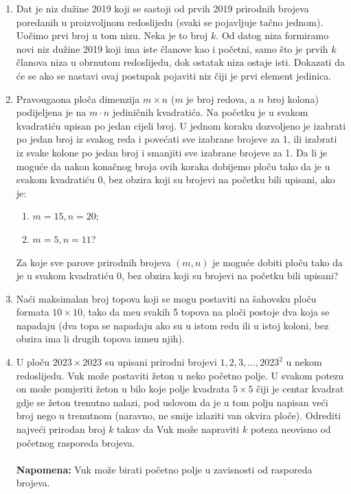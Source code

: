\documentclass{article}
\begin{document}
\begin{enumerate}
    \item Dat je niz du\v{z}ine 2019 koji se sastoji od prvih 2019 prirodnih brojeva poredanih u proizvoljnom redoslijedu (svaki se pojavljuje ta\v{c}no jednom). Uo\v{c}imo prvi broj u tom nizu. Neka je to broj $k$. Od datog niza formiramo novi niz du\v{z}ine 2019 koji ima iste \v{c}lanove kao i po\v{c}etni, samo \v{s}to je prvih $k$ \v{c}lanova niza u obrnutom redoslijedu, dok ostatak niza ostaje isti. Dokazati da \'ce se ako se nastavi ovaj postupak pojaviti niz \v{c}iji je prvi element jedinica.

    \item Pravougaona plo\v{c}a dimenzija $m \times n$ ($m$ je broj redova, a $n$ broj kolona) podijeljena je na $m \cdot n$ jedini\v{c}nih kvadrati\'ca. Na po\v{c}etku je u svakom kvadrati\'cu upisan po jedan cijeli broj. U jednom koraku dozvoljeno je izabrati po jedan broj iz svakog reda i pove\'cati sve izabrane brojeve za 1, ili izabrati iz svake kolone po jedan broj i smanjiti sve izabrane brojeve za 1. Da li je mogu\'ce da nakon kona\v{c}nog broja ovih koraka dobijemo plo\v{c}u tako da je u svakom kvadrati\'cu 0, bez obzira koji su brojevi na po\v{c}etku bili upisani, ako je:
    \begin{enumerate}
        \item[a)] $m = 15, n = 20$;
        \item[b)] $m = 5, n = 11$?
    \end{enumerate}
    Za koje sve parove prirodnih brojeva $(m, n)$ je mogu\'ce dobiti plo\v{c}u tako da je u svakom kvadrati\'cu 0, bez obzira koji su brojevi na po\v{c}etku bili upisani?

    \item Na\'ci maksimalan broj topova koji se mogu postaviti na \v{s}ahovsku plo\v{c}u formata $10 \times 10$, tako da me\dj u svakih 5 topova na plo\v{c}i postoje dva koja se napadaju (dva topa se napadaju ako su u istom redu ili u istoj koloni, bez obzira ima li drugih topova izme\dj u njih).

    \item U plo\v{c}u $2023 \times 2023$ su upisani prirodni brojevi $1, 2, 3, \ldots, 2023^2$ u nekom redoslijedu. Vuk mo\v{z}e postaviti \v{z}eton u neko po\v{c}etno polje. U svakom potezu on mo\v{z}e pomjeriti \v{z}eton u bilo koje polje kvadrata $5 \times 5$ \v{c}iji je centar kvadrat gdje se \v{z}eton trenutno nalazi, pod uslovom da je u tom polju napisan ve\'ci broj nego u trenutnom (naravno, ne smije izlaziti van okvira plo\v{c}e). Odrediti najve\'ci prirodan broj $k$ takav da Vuk mo\v{z}e napraviti $k$ poteza neovisno od po\v{c}etnog rasporeda brojeva.\\
    \\
    \textbf{Napomena:} Vuk mo\v{z}e birati po\v{c}etno polje u zavisnosti od rasporeda brojeva.
\end{enumerate}
\end{document}
